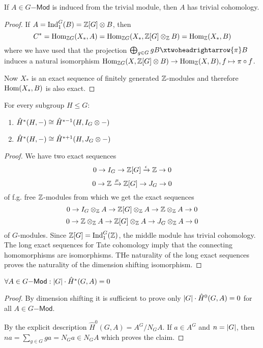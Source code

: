\documentclass[fontsize=11pt,fleqn,a4paper]{scrartcl}
\begin{document}
\begin{theorem}
If $A\in G\mathsf{-Mod}$ is induced from the trivial module, then $A$ has trivial cohomology.
\end{theorem}
\begin{proof}
If $A=\operatorname{Ind}_1^G(B) = \mathbb{Z}[G]\otimes B$, then
\[C^\ast = \operatorname{Hom}_{\mathbb{Z} G}(X_\ast, A) = \operatorname{Hom}_{\mathbb{Z} G}(X_\ast,\mathbb{Z}[G]\otimes_{\mathbb{Z}} B) = \operatorname{Hom}_{\mathbb{Z}}(X_\ast,B)\]
where we have used that the projection $\bigoplus_{g\in G} gB \xtwoheadrightarrow{\pi} B$ induces a natural isomorphism $\operatorname{Hom}_{\mathbb{Z} G}(X,\mathbb{Z}[G]\otimes B) \to \operatorname{Hom}_{\mathbb{Z}}(X,B), f\mapsto \pi\circ f$.

Now $X_\ast$ is an exact sequence of finitely generated $\mathbb{Z}$-modules and therefore $\operatorname{Hom}(X_\ast,B)$ is also exact.
\end{proof}

\begin{theorem}
For every subgroup $H\leq G$:
\begin{enumerate}
\item $\hat{H}^\ast(H,-) \cong \hat{H}^{\ast-1}(H,I_G\otimes -)$
\item $\hat{H}^\ast(H,-) \cong \hat{H}^{\ast+1}(H,J_G\otimes -)$
\end{enumerate}
\end{theorem}
\begin{theorem}
\end{theorem}
\begin{proof}
We have two exact sequences
\[0\to I_G\to\mathbb{Z}[G]\xrightarrow{\epsilon} \mathbb{Z}\to 0\]
\[0\to \mathbb{Z} \xrightarrow{\mu} \mathbb{Z}[G] \to J_G \to 0\]
of f.g. free $\mathbb{Z}$-modules from which we get the exact sequences
\[0 \to I_G \otimes_{\mathbb{Z}} A \to \mathbb{Z}[G]\otimes_{\mathbb{Z}} A \to \mathbb{Z}\otimes_{\mathbb{Z}} A \to 0\]
\[0 \to \mathbb{Z}\otimes_{\mathbb{Z}} A\to \mathbb{Z}[G]\otimes_{\mathbb{Z}} A\to J_G\otimes_{\mathbb{Z}} A\to 0\]
of $G$-modules. Since $\mathbb{Z}[G]=\operatorname{Ind}_1^G(\mathbb{Z})$, the middle module has trivial cohomology. The long exact sequences for Tate cohomology imply that the connecting homomorphisms are isomorphisms. THe naturality of the long exact sequences proves the naturality of the dimension shifting isomorphism.
\end{proof}

\begin{corollary}
$\forall A\in G\mathsf{-Mod}: \lvert G\rvert \cdot \hat{H}^\ast(G,A) = 0$
\end{corollary}
\begin{proof}
By dimension shifting it is sufficient to prove only $\lvert G\rvert \cdot \hat{H}^0(G,A) = 0$ for all $A\in G\mathsf{-Mod}$.

By the explicit description $\hat{H}^0(G,A) = A^G/N_G A$. If $a\in A^G$ and $n=\lvert G\rvert$, then $na = \sum_{g\in G} ga = N_G a \in N_G A$ which proves the claim.
\end{proof}
\end{document}
